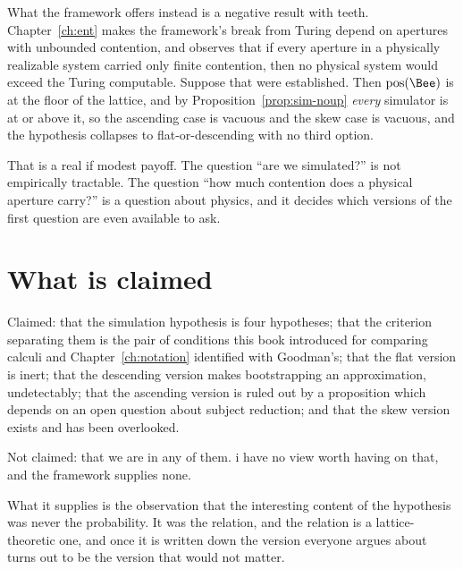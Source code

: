 What the framework offers instead is a negative result with teeth.
Chapter~\ref{ch:ent} makes the framework's break from Turing depend on
apertures with unbounded contention, and observes that if every aperture
in a physically realizable system carried only finite contention, then no
physical system would exceed the Turing computable.
Suppose that were established.
Then $\mathrm{pos}(\Bee)$ is at the floor of the lattice, and by
Proposition~\ref{prop:sim-noup} \emph{every} simulator is at or above it,
so the ascending case is vacuous and the skew case is vacuous, and the
hypothesis collapses to flat-or-descending with no third option.

That is a real if modest payoff.
The question ``are we simulated?'' is not empirically tractable.
The question ``how much contention does a physical aperture carry?'' is a
question about physics, and it decides which versions of the first
question are even available to ask.

\section{What is claimed}

Claimed: that the simulation hypothesis is four hypotheses; that the
criterion separating them is the pair of conditions this book introduced
for comparing calculi and Chapter~\ref{ch:notation} identified with
Goodman's; that the flat version is inert; that the descending version
makes bootstrapping an approximation, undetectably; that the ascending
version is ruled out by a proposition which depends on an open question
about subject reduction; and that the skew version exists and has been
overlooked.

Not claimed: that we are in any of them.
i have no view worth having on that, and the framework supplies none.

What it supplies is the observation that the interesting content of the
hypothesis was never the probability.
It was the relation, and the relation is a lattice-theoretic one, and
once it is written down the version everyone argues about turns out to be
the version that would not matter.

